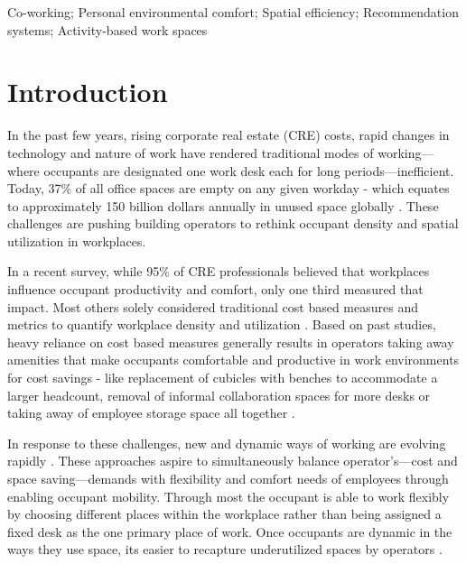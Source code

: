 \documentclass[]{interact}
\theoremstyle{plain}%
\theoremstyle{definition}
\theoremstyle{remark}
\begin{document}
\begin{keywords}
Co-working; Personal environmental comfort; Spatial efficiency; Recommendation systems; Activity-based work spaces
\end{keywords}




\section{Introduction}

In the past few years, rising corporate real estate (CRE) costs, rapid changes in technology and nature of work have rendered traditional modes of working---where occupants are designated one work desk each for long periods---inefficient. Today, 37\% of all office spaces are empty on any given workday \citep{jll} - which equates to approximately 150 billion dollars annually in unused space globally \citep{cbre}. These challenges are pushing building operators to rethink occupant density and spatial utilization in workplaces.  


In a recent survey, while 95\% of CRE professionals believed that workplaces influence occupant productivity and comfort, only one third measured that impact. Most others solely considered traditional cost based measures and metrics to quantify workplace density and utilization \citep{gensler}. Based on past studies, heavy reliance on cost based measures generally results in operators taking away amenities that make occupants comfortable and productive in work environments for cost savings - like replacement of cubicles with benches to accommodate a larger headcount, removal of informal collaboration spaces for more desks or taking away of employee storage space all together \citep{cbre}.

 

In response to these challenges, new and dynamic ways of working are evolving rapidly . These approaches aspire to simultaneously balance operator's---cost and space saving---demands with flexibility and comfort needs of employees through enabling occupant mobility. Through most the occupant is able to work flexibly by choosing different places within the workplace rather than being assigned a fixed desk as the one primary place of work. Once occupants are dynamic in the ways they use space, its easier to recapture underutilized spaces by operators \citep{cbre}.
\end{document}
